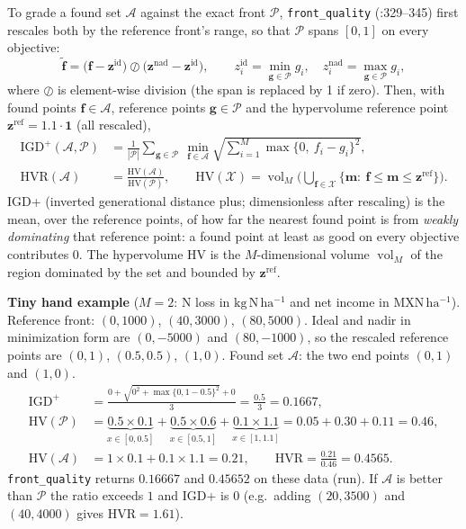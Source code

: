 \documentclass[11pt,a4paper]{article}
\newcommand{\code}[1]{\texttt{\nolinkurl{#1}}}
\newcommand{\kgNha}{\mathrm{kg\,N\,ha^{-1}}}
\newcommand{\mxnha}{\mathrm{MXN\,ha^{-1}}}
\begin{document}
To grade a found set $\mathcal A$ against the exact front $\mathcal P$, \code{front_quality} (:329--345) first rescales both
by the reference front's range, so that $\mathcal P$ spans $[0,1]$ on every objective:
\begin{equation}
\tilde{\mathbf f}=\big(\mathbf f-\mathbf z^{\mathrm{id}}\big)\oslash\big(\mathbf z^{\mathrm{nad}}-\mathbf z^{\mathrm{id}}\big),\qquad
z^{\mathrm{id}}_i=\min_{\mathbf g\in\mathcal P}g_i,\quad z^{\mathrm{nad}}_i=\max_{\mathbf g\in\mathcal P}g_i ,
\label{eq:rescale}
\end{equation}
where $\oslash$ is element-wise division (the span is replaced by 1 if zero). Then, with found points $\mathbf f\in\mathcal A$, reference points $\mathbf g\in\mathcal P$ and
the hypervolume reference point $\mathbf z^{\mathrm{ref}}=1.1\cdot\mathbf 1$ (all rescaled),
\begin{align}
\mathrm{IGD}^+(\mathcal A,\mathcal P)&=\frac1{|\mathcal P|}\sum_{\mathbf g\in\mathcal P}\ \min_{\mathbf f\in\mathcal A}
 \sqrt{\sum_{i=1}^{M}\max\{0,\ f_i-g_i\}^2},
\label{eq:igd}\\
\mathrm{HVR}(\mathcal A)&=\frac{\mathrm{HV}(\mathcal A)}{\mathrm{HV}(\mathcal P)},\qquad
\mathrm{HV}(\mathcal X)=\operatorname{vol}_M\!\Big(\bigcup_{\mathbf f\in\mathcal X}\{\mathbf m:\ \mathbf f\le\mathbf m\le\mathbf z^{\mathrm{ref}}\}\Big).
\label{eq:hvr}
\end{align}
IGD+ (inverted generational distance plus; dimensionless after rescaling) is the mean, over the reference points, of how far the
nearest found point is from \emph{weakly dominating} that reference point: a found point at least as good on every objective
contributes $0$. The hypervolume $\mathrm{HV}$ is the $M$-dimensional volume $\operatorname{vol}_M$ of the region dominated by the set
and bounded by $\mathbf z^{\mathrm{ref}}$.

\textbf{Tiny hand example} ($M=2$: N loss in $\kgNha$ and net income in $\mxnha$). Reference front: $(0,1000)$, $(40,3000)$, $(80,5000)$.
Ideal and nadir in minimization form are $(0,-5000)$ and $(80,-1000)$, so the rescaled reference points are
$(0,1)$, $(0.5,0.5)$, $(1,0)$. Found set $\mathcal A$: the two end points $(0,1)$ and $(1,0)$.
\begin{equation}
\begin{aligned}
\mathrm{IGD}^+ &= \frac{0+\sqrt{0^2+\max\{0,1-0.5\}^2}+0}{3}=\frac{0.5}{3}=0.1667,\\
\mathrm{HV}(\mathcal P) &= \underbrace{0.5\times0.1}_{x\in[0,0.5]}+\underbrace{0.5\times0.6}_{x\in[0.5,1]}+\underbrace{0.1\times1.1}_{x\in[1,1.1]}=0.05+0.30+0.11=0.46,\\
\mathrm{HV}(\mathcal A) &= 1\times0.1+0.1\times1.1=0.21,\qquad \mathrm{HVR}=\frac{0.21}{0.46}=0.4565 .
\end{aligned}
\label{eq:toyigd}
\end{equation}
\code{front_quality} returns $0.16667$ and $0.45652$ on these data (run). If $\mathcal A$ is better than $\mathcal P$
the ratio exceeds $1$ and IGD+ is $0$ (e.g.\ adding $(20,3500)$ and $(40,4000)$ gives $\mathrm{HVR}=1.61$).
\end{document}
